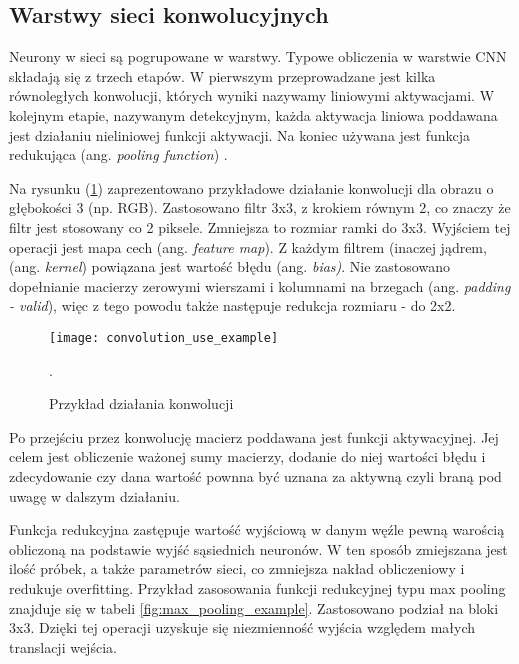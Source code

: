 \subsection{Warstwy sieci konwolucyjnych}

Neurony w sieci są pogrupowane w warstwy. Typowe obliczenia w warstwie CNN składają się z trzech etapów. W pierwszym przeprowadzane jest kilka równoległych konwolucji, których wyniki nazywamy liniowymi aktywacjami. W kolejnym etapie, nazywanym detekcyjnym, każda aktywacja liniowa poddawana jest działaniu nieliniowej funkcji aktywacji. Na koniec używana jest funkcja redukująca (ang. \textit{pooling function}) \cite{deep_learning}.

{\parindent0pt %
Na rysunku (\ref{fig:convolution_example}) zaprezentowano przykładowe działanie konwolucji dla obrazu o głębokości 3 (np. RGB). Zastosowano filtr 3x3, z krokiem równym 2, co znaczy że filtr jest stosowany co 2 piksele. Zmniejsza to rozmiar ramki do 3x3. Wyjściem tej operacji jest mapa cech (ang. \textit{feature map}). Z każdym filtrem (inaczej jądrem, (ang. \textit{kernel}) powiązana jest wartość błędu (ang. \textit{bias)}. Nie zastosowano dopełnianie macierzy zerowymi wierszami i kolumnami na brzegach (ang. \textit{padding - valid}), więc z tego powodu także następuje redukcja rozmiaru - do 2x2. 

\begin{figure}[h]
	\centering
	\centering
		\texttt{[image: convolution\_use\_example]}	
	\caption{Przykład działania konwolucji}.
	\label{fig:convolution_example}
\end{figure}

Po przejściu przez konwolucję macierz poddawana jest funkcji aktywacyjnej. Jej celem jest obliczenie ważonej sumy macierzy, dodanie do niej wartości błędu i zdecydowanie czy dana wartość pownna być uznana za aktywną czyli braną pod uwagę w dalszym działaniu.

Funkcja redukcyjna zastępuje wartość wyjściową w danym węźle pewną warością obliczoną na podstawie wyjść sąsiednich neuronów. W ten sposób zmiejszana jest ilość próbek, a także parametrów sieci, co zmniejsza nakład obliczeniowy i redukuje overfitting. Przykład zasosowania funkcji redukcyjnej typu max pooling znajduje się w tabeli \ref{fig:max_pooling_example}. Zastosowano podział na bloki 3x3. Dzięki tej operacji uzyskuje się niezmienność wyjścia względem małych translacji wejścia.

}
